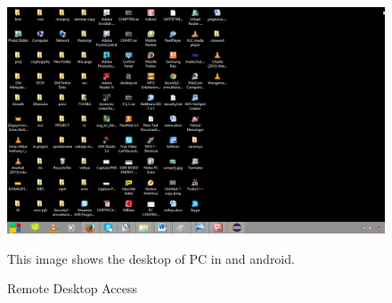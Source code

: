 \begin{figure}
\begin{center}
\scalebox{0.25}
{\includegraphics{desk.png}}
\caption{Remote Desktop Access}  
\end{center}
This image shows the desktop of PC in and android.
\end{figure}


